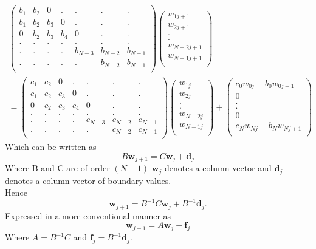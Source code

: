 \begin{eqnarray*}
\left(\begin{array}{ccccccc}
b_1&b_2&0&.&.&.&.\\
b_1&b_2&b_3&0&.&.&.\\
0&b_2&b_3&b_4&0&.&.\\
.&.&.&.&.&.&.\\
.&.&.&.&b_{N-3}&b_{N-2}&b_{N-1}\\
.&.&.&.&.&b_{N-2}&b_{N-1}\\
\end{array}\right)
\left(\begin{array}{c}
w_{1j+1}\\
w_{2j+1}\\
.\\
.\\
w_{N-2j+1}\\
w_{N-1j+1}\\
\end{array}\right)
\\
=
\left(\begin{array}{ccccccc}
c_1&c_2&0&.&.&.&.\\
c_1&c_2&c_3&0&.&.&.\\
0&c_2&c_3&c_4&0&.&.\\
.&.&.&.&.&.&.\\
.&.&.&.&c_{N-3}&c_{N-2}&c_{N-1}\\
.&.&.&.&.&c_{N-2}&c_{N-1}\\
\end{array}\right)
\left(\begin{array}{c}
w_{1j}\\
w_{2j}\\
.\\
.\\
w_{N-2j}\\
w_{N-1j}\\
\end{array}\right)
+
\left(\begin{array}{c}
c_0w_{0j}-b_0w_{0j+1}\\
0\\
.\\
.\\
0\\
c_Nw_{Nj}-b_{N}w_{Nj+1}\\
\end{array}\right)
\end{eqnarray*}
Which can be written as
\[ B\mathbf{w}_{j+1}=C\mathbf{w}_j+\mathbf{d}_j \]
Where B and C are of order $(N-1)$ $\mathbf{w}_j$ denotes a column vector and
$\mathbf{d}_j$ denotes a column vector of boundary values.\\
Hence
\[ \mathbf{w}_{j+1}=B^{-1}C\mathbf{w}_j+B^{-1}\mathbf{d}_j. \]
Expressed in a more conventional manner as
\[ \mathbf{w}_{j+1}=A\mathbf{w}_j+\mathbf{f}_j \]
Where $A=B^{-1}C$ and $\mathbf{f}_j =B^{-1}\mathbf{d}_j$.  

